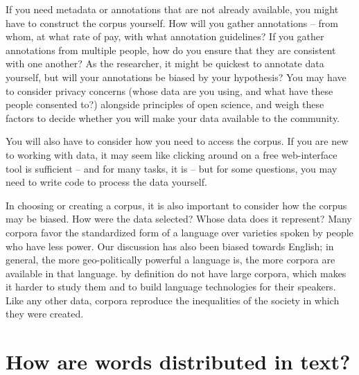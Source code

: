 If you need metadata or annotations that are not already available, you might have to construct the corpus yourself.  How will you gather annotations -- from whom, at what rate of pay,  with what annotation guidelines?  If you gather annotations from multiple people, how do you ensure that they are consistent with one another?  As the researcher, it might be quickest to annotate data yourself, but will your annotations be biased by your hypothesis?  You may have to consider privacy concerns (whose data are you using, and what have these people consented to?) alongside principles of open science, and weigh these factors to decide whether you will make your data available to the community.




You will also have to consider how you need to
access the corpus. If you are new to working with data, it may seem
like clicking around on a free web-interface tool is sufficient -- and
for many tasks, it is -- but for some questions, you may need to
write code to process the data yourself.

In choosing or creating a corpus, it is also important to consider how
the corpus may be biased.  How were the data selected?  Whose data does it represent?  Many corpora
favor the standardized form of a language over varieties spoken by
people who have less power.  Our discussion has also been biased
towards English; in general, the more geo-politically powerful a
language is, the more corpora are available in that language.
 by
definition do not have large corpora, which makes it harder to study
them and to build language technologies for their speakers.  Like any
other data, corpora reproduce the inequalities of the society in which
they were created.


\section{How are words distributed in text?} 

